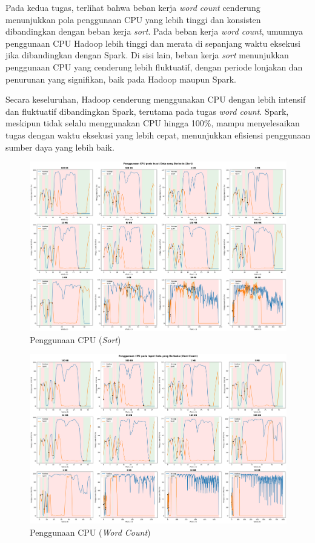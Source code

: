 Pada kedua tugas, terlihat bahwa beban kerja \textit{word count} cenderung menunjukkan pola penggunaan CPU yang lebih tinggi dan konsisten dibandingkan dengan beban kerja \textit{sort}. Pada beban kerja \textit{word count}, umumnya penggunaan CPU Hadoop lebih tinggi dan merata di sepanjang waktu eksekusi jika dibandingkan dengan Spark. Di sisi lain, beban kerja \textit{sort} menunjukkan penggunaan CPU yang cenderung lebih fluktuatif, dengan periode lonjakan dan penurunan yang signifikan, baik pada Hadoop maupun Spark.

Secara keseluruhan, Hadoop cenderung menggunakan CPU dengan lebih intensif dan fluktuatif dibandingkan Spark, terutama pada tugas \textit{word count}. Spark, meskipun tidak selalu menggunakan CPU hingga 100\%, mampu menyelesaikan tugas dengan waktu eksekusi yang lebih cepat, menunjukkan efisiensi penggunaan sumber daya yang lebih baik.

\begin{landscape}
\begin{figure}[h]
    \centering
    \includegraphics[height=0.6\linewidth]{figures/ch04/4-penggunaan-cpu-all-sort.png}
    \caption{Penggunaan CPU (\textit{Sort})}
    \label{fig:4-penggunaan-cpu-all-sort}
\end{figure}
\end{landscape}

\begin{landscape}
\begin{figure}[h]
    \centering
    \includegraphics[height=0.6\linewidth]{figures/ch04/4-penggunaan-cpu-all-wordcount.png}
    \caption{Penggunaan CPU (\textit{Word Count})}
    \label{fig:4-penggunaan-cpu-all-wordcount}
\end{figure}
\end{landscape}

